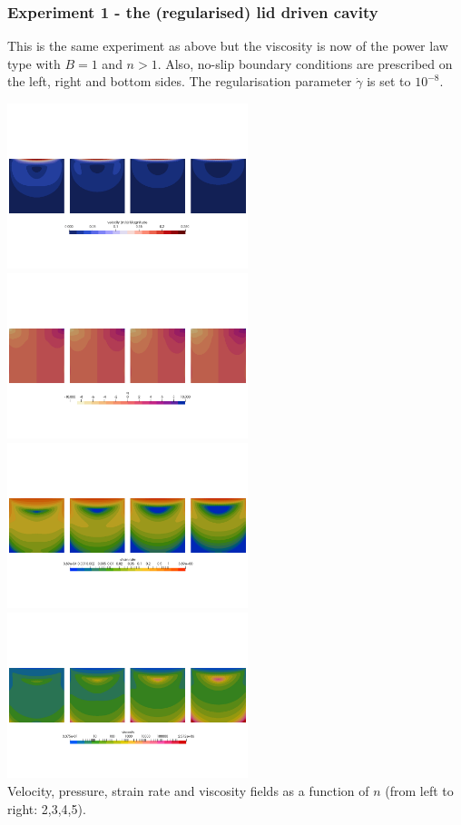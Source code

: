 \subsubsection*{Experiment 1 - the (regularised) lid driven cavity}

This is the same experiment as above but the viscosity is now of the 
power law type with $B=1$ and $n>1$. Also, no-slip boundary conditions 
are prescribed on the left, right and bottom sides. 
The regularisation parameter $\dot{\gamma}$ is set to $10^{-8}$.

\begin{center}
\includegraphics[width=7cm]{python_codes/fieldstone_87/results/experiment_01/vel.png}
\includegraphics[width=7cm]{python_codes/fieldstone_87/results/experiment_01/p.png}\\
\includegraphics[width=7cm]{python_codes/fieldstone_87/results/experiment_01/sr.png}
\includegraphics[width=7cm]{python_codes/fieldstone_87/results/experiment_01/eta.png}\\
{\captionfont Velocity, pressure, strain rate and viscosity fields as a function 
of $n$ (from left to right: 2,3,4,5).} 
\end{center}

